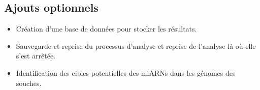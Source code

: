 \subsection{Ajouts optionnels}
\begin{itemize}
    \item Création d'une base de données pour stocker les résultats.
    \item Sauvegarde et reprise du processus d'analyse et reprise de l'analyse là où elle s'est arrêtée.
    \item Identification des cibles potentielles des miARNs dans les génomes des souches.
\end{itemize}